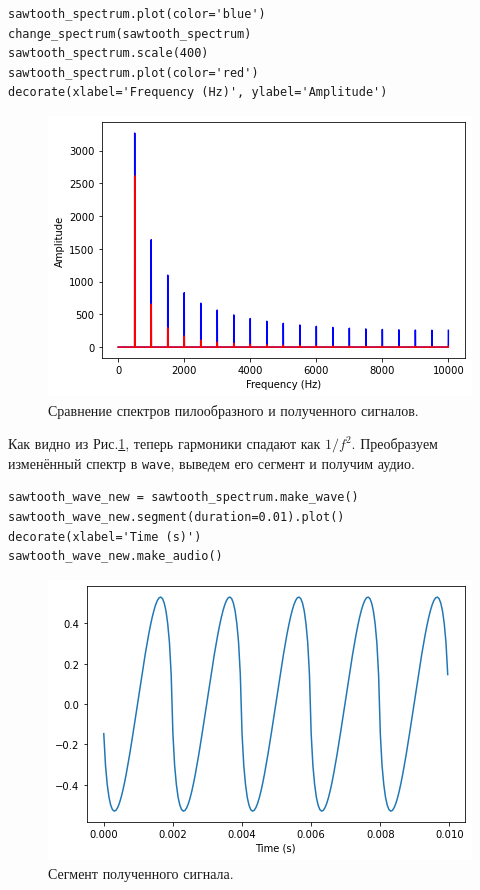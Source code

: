 \documentclass[a4paper, 14pt]{extarticle}
\begin{document}
    \begin{lstlisting}[caption= Изменение спада гармоник и сравнение спектров., label={lst:task6_change_and_compare_spectrum}]
sawtooth_spectrum.plot(color='blue')
change_spectrum(sawtooth_spectrum)
sawtooth_spectrum.scale(400)
sawtooth_spectrum.plot(color='red')
decorate(xlabel='Frequency (Hz)', ylabel='Amplitude')
    \end{lstlisting}

    \begin{figure}[h]
        \centering
        \includegraphics[width=0.8\linewidth]{resources/Images/task6_compare_spectrum}
        \caption{Сравнение спектров пилообразного и полученного сигналов.}
        \label{fig:task6_compare_spectrum}
    \end{figure}

    Как видно из Рис.\ref{fig:task6_compare_spectrum}, теперь гармоники спадают как $1/f^2$.
    Преобразуем изменённый спектр в \texttt{wave}, выведем его сегмент и получим аудио.

    \begin{lstlisting}[caption= Получение аудио и \texttt{wave}., label={lst:task6_wave_and_audio}]
sawtooth_wave_new = sawtooth_spectrum.make_wave()
sawtooth_wave_new.segment(duration=0.01).plot()
decorate(xlabel='Time (s)')
sawtooth_wave_new.make_audio()
    \end{lstlisting}

    \begin{figure}[H]
        \centering
        \includegraphics[width=0.8\linewidth]{resources/Images/task6_signal_wave}
        \caption{Сегмент полученного сигнала.}
        \label{fig:task6_signal_wave}
    \end{figure}
\end{document}
